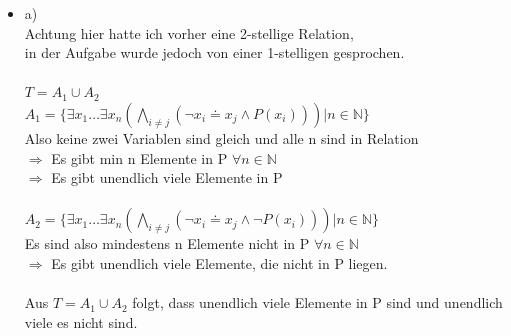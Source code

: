 \documentclass[a4paper]{scrartcl}
\begin{document}
    \begin{itemize}
        \item a)\\
            Achtung hier hatte ich vorher eine 2-stellige Relation,
            \\in der Aufgabe wurde jedoch von einer 1-stelligen gesprochen.\\
            \\$T = A_1 \cup A_2$\\
            $A_1 = \{\exists x_1 \dots \exists x_n (\bigwedge_{i \neq j}(\neg x_i \doteq x_j \land P(x_i))) | n \in \mathds{N}\}$\\
            Also keine zwei Variablen sind gleich und alle n sind in Relation\\
            $\Rightarrow$ Es gibt min n Elemente in P $\forall n \in \mathds{N}$\\
            $\Rightarrow$ Es gibt unendlich viele Elemente in P\\
            \\$A_2 = \{\exists x_1 \dots \exists x_n (\bigwedge_{i \neq j}(\neg x_i \doteq x_j \land \neg P(x_i))) | n \in \mathds{N}\}$\\
            Es sind also mindestens n Elemente nicht in P $\forall n \in \mathds{N}$\\
            $\Rightarrow$ Es gibt unendlich viele Elemente, die nicht in P liegen.\\
            \\Aus $T = A_1 \cup A_2$ folgt, dass unendlich viele Elemente in P sind und unendlich viele es nicht sind.\\


\end{itemize}
\end{document}
